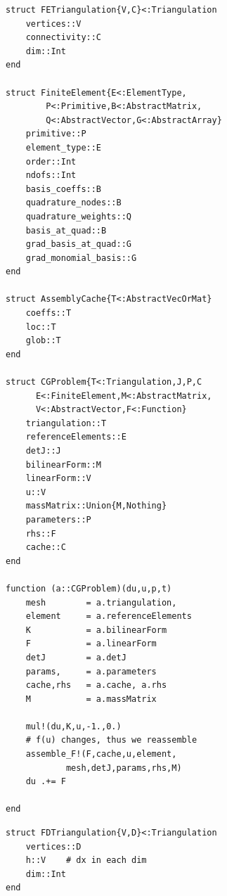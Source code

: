 \documentclass[asi,article,submit,moreauthors]{Definitions/mdpi}
\begin{document}
\begin{figure}[!htbp]
\begin{minipage}[t]{0.5\textwidth}
\centering
\begin{verbatim}
struct FETriangulation{V,C}<:Triangulation
    vertices::V
    connectivity::C
    dim::Int
end

struct FiniteElement{E<:ElementType,
        P<:Primitive,B<:AbstractMatrix,
        Q<:AbstractVector,G<:AbstractArray}
    primitive::P
    element_type::E
    order::Int
    ndofs::Int
    basis_coeffs::B
    quadrature_nodes::B
    quadrature_weights::Q
    basis_at_quad::B
    grad_basis_at_quad::G
    grad_monomial_basis::G
end

struct AssemblyCache{T<:AbstractVecOrMat}
    coeffs::T
    loc::T
    glob::T
end

struct CGProblem{T<:Triangulation,J,P,C
      E<:FiniteElement,M<:AbstractMatrix,
      V<:AbstractVector,F<:Function}
    triangulation::T
    referenceElements::E
    detJ::J
    bilinearForm::M
    linearForm::V
    u::V
    massMatrix::Union{M,Nothing}
    parameters::P
    rhs::F
    cache::C
end

function (a::CGProblem)(du,u,p,t)
    mesh        = a.triangulation,
    element     = a.referenceElements
    K           = a.bilinearForm
    F           = a.linearForm
    detJ        = a.detJ
    params,     = a.parameters
    cache,rhs   = a.cache, a.rhs
    M           = a.massMatrix

    mul!(du,K,u,-1.,0.)
    # f(u) changes, thus we reassemble
    assemble_F!(F,cache,u,element,
            mesh,detJ,params,rhs,M)
    du .+= F

end
\end{verbatim}
\end{minipage}
\begin{minipage}[t]{0.5\textwidth}
\centering
\begin{verbatim}
struct FDTriangulation{V,D}<:Triangulation
    vertices::D
    h::V    # dx in each dim
    dim::Int
end























\end{verbatim}
\end{minipage}
\end{figure}
\end{document}

